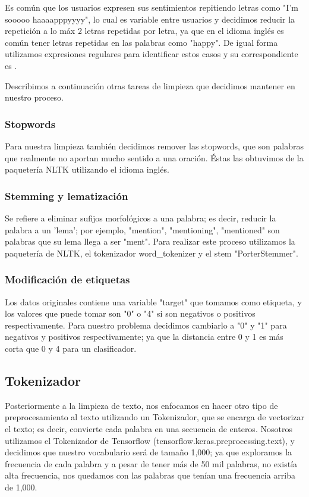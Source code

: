 \documentclass[sigconf, nonacm, spanish]{acmart}
\begin{document}
Es común que los usuarios expresen sus sentimientos repitiendo letras como "I'm sooooo haaaapppyyyy", lo cual es variable entre usuarios y decidimos reducir la repetición a lo máx 2 letras repetidas por letra, ya que en el idioma inglés es común tener letras repetidas en las palabras como "happy". De igual forma utilizamos expresiones regulares para identificar estos casos y su correspondiente es .

Describimos a continuación otras tareas de limpieza que decidimos mantener en nuestro proceso.

\subsubsection{Stopwords}

Para nuestra limpieza también decidimos remover las stopwords, que son palabras que realmente no aportan mucho sentido a una oración. Éstas las obtuvimos de la paquetería NLTK utilizando el idioma inglés.

\subsubsection{Stemming y lematización}

Se refiere a eliminar sufijos morfológicos a una palabra; es decir, reducir la palabra a un 'lema'; por ejemplo, "mention", "mentioning", "mentioned" son palabras que su lema llega a ser "ment". Para realizar este proceso utilizamos la paquetería de NLTK, el tokenizador word\_tokenizer y el stem "PorterStemmer". 

\subsubsection{Modificación de etiquetas}

Los datos originales contiene una variable "target" que tomamos como etiqueta, y los valores que puede tomar son "0" o "4" si son negativos o positivos respectivamente. Para nuestro problema decidimos cambiarlo a "0" y "1" para negativos y positivos respectivamente; ya que la distancia entre 0 y 1 es más corta que 0 y 4 para un clasificador.

\subsection{Tokenizador}
Posteriormente a la limpieza de texto, nos enfocamos en hacer otro tipo de preprocesamiento al texto utilizando un Tokenizador, que se encarga de vectorizar el texto; es decir, convierte cada palabra en una secuencia de enteros. Nosotros utilizamos el Tokenizador de Tensorflow (tensorflow.keras.preprocessing.text), y decidimos que nuestro vocabulario será de tamaño 1,000; ya que exploramos la frecuencia de cada palabra y a pesar de tener más de 50 mil palabras, no existía alta frecuencia, nos quedamos con las palabras que tenían una frecuencia arriba de 1,000.
\end{document}
